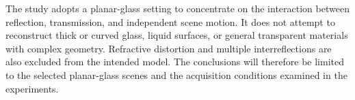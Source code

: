 The study adopts a planar-glass setting to concentrate on the interaction between reflection, transmission, and independent scene motion. It does not attempt to reconstruct thick or curved glass, liquid surfaces, or general transparent materials with complex geometry. Refractive distortion and multiple interreflections are also excluded from the intended model. The conclusions will therefore be limited to the selected planar-glass scenes and the acquisition conditions examined in the experiments.
